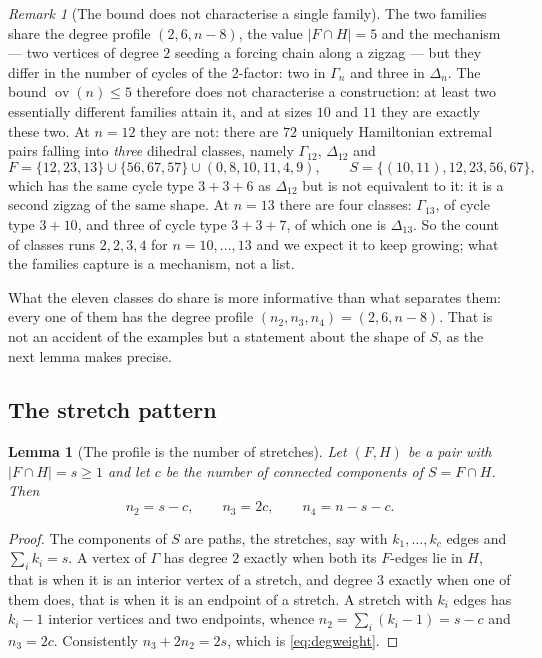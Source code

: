 \documentclass[11pt,a4paper]{article}
\newtheorem{lemma}[theorem]{Lemma}
\theoremstyle{definition}
\theoremstyle{remark}
\newtheorem{remark}[theorem]{Remark}
\newcommand{\ov}{\operatorname{ov}}
\begin{document}
\begin{remark}[The bound does not characterise a single family]\label{rem:two}
The two families share the degree profile $(2,6,n-8)$, the value $|F\cap H|=5$ and the mechanism --- two vertices of degree $2$ seeding a forcing chain along a zigzag --- but they differ in the number of cycles of the 2-factor: two in $\Gamma_n$ and three in $\Delta_n$. The bound $\ov(n)\le5$ therefore does not characterise a construction: at least two essentially different families attain it, and at sizes $10$ and $11$ they are exactly these two. At $n=12$ they are not: there are $72$ uniquely Hamiltonian extremal pairs falling into \emph{three} dihedral classes, namely $\Gamma_{12}$, $\Delta_{12}$ and
\[
F=\{12,23,13\}\cup\{56,67,57\}\cup(0,8,10,11,4,9),
\qquad S=\{(10,11),12,23,56,67\},
\]
which has the same cycle type $3+3+6$ as $\Delta_{12}$ but is not equivalent to it: it is a second zigzag of the same shape. At $n=13$ there are four classes: $\Gamma_{13}$, of cycle type $3+10$, and three of cycle type $3+3+7$, of which one is $\Delta_{13}$. So the count of classes runs $2,2,3,4$ for $n=10,\dots,13$ and we expect it to keep growing; what the families capture is a mechanism, not a list.

What the eleven classes do share is more informative than what separates them: every one of them has the degree profile $(n_2,n_3,n_4)=(2,6,n-8)$. That is not an accident of the examples but a statement about the shape of $S$, as the next lemma makes precise.
\end{remark}

\subsection{The stretch pattern}\label{sub:patron}

\begin{lemma}[The profile is the number of stretches]\label{lem:stretches}
Let $(F,H)$ be a pair with $|F\cap H|=s\ge1$ and let $c$ be the number of connected components of $S=F\cap H$. Then
\[
n_2=s-c,\qquad n_3=2c,\qquad n_4=n-s-c .
\]
\end{lemma}

\begin{proof}
The components of $S$ are paths, the stretches, say with $k_1,\dots,k_c$ edges and $\sum_ik_i=s$. A vertex of $\Gamma$ has degree $2$ exactly when both its $F$-edges lie in $H$, that is when it is an interior vertex of a stretch, and degree $3$ exactly when one of them does, that is when it is an endpoint of a stretch. A stretch with $k_i$ edges has $k_i-1$ interior vertices and two endpoints, whence $n_2=\sum_i(k_i-1)=s-c$ and $n_3=2c$. Consistently $n_3+2n_2=2s$, which is \eqref{eq:degweight}.
\end{proof}
\end{document}

